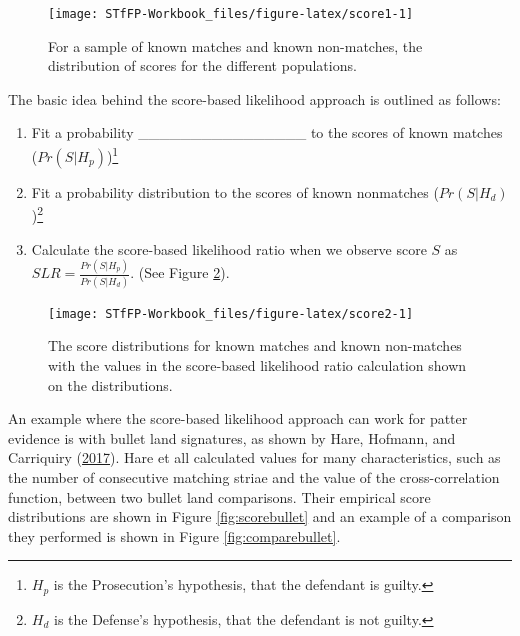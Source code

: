 \documentclass[]{book}
\providecommand{\tightlist}{%
  \setlength{\itemsep}{0pt}\setlength{\parskip}{0pt}}
\let\rmarkdownfootnote\footnote%
\def\footnote{\protect\rmarkdownfootnote}
\theoremstyle{definition}
\theoremstyle{definition}
\theoremstyle{remark}
\begin{document}
\begin{figure}

{\centering \texttt{[image: STfFP-Workbook\_files/figure-latex/score1-1]} 

}

\caption{For a sample of known matches and known non-matches, the distribution of scores for the different populations.}\label{fig:score1}
\end{figure}

The basic idea behind the score-based likelihood approach is outlined as
follows:

\begin{enumerate}
\def\labelenumi{\arabic{enumi}.}
\tightlist
\item
  Fit a probability \_\_\_\_\_\_\_\_\_\_\_\_\_\_\_\_ to the scores of
  known matches (\(Pr(S|H_p)\))\footnote{\(H_p\) is the Prosecution's
    hypothesis, that the defendant is guilty.} \vspace{.1in}
\item
  Fit a probability distribution to the scores of known nonmatches
  (\(Pr(S|H_d)\))\footnote{\(H_d\) is the Defense's hypothesis, that the
    defendant is not guilty.} \vspace{.1in}
\item
  Calculate the score-based likelihood ratio when we observe score \(S\)
  as \(SLR = \frac{Pr(S|H_p)}{Pr(S|H_d)}\). (See Figure
  \ref{fig:score2}).
\end{enumerate}

\begin{figure}

{\centering \texttt{[image: STfFP-Workbook\_files/figure-latex/score2-1]} 

}

\caption{The score distributions for known matches and known non-matches with the values in the score-based likelihood ratio calculation shown on the distributions.}\label{fig:score2}
\end{figure}

An example where the score-based likelihood approach can work for patter
evidence is with bullet land signatures, as shown by Hare, Hofmann, and
Carriquiry (\protect\hyperlink{ref-hare}{2017}). Hare et all calculated
values for many characteristics, such as the number of consecutive
matching striae and the value of the cross-correlation function, between
two bullet land comparisons. Their empirical score distributions are
shown in Figure \ref{fig:scorebullet} and an example of a comparison
they performed is shown in Figure \ref{fig:comparebullet}.
\end{document}
